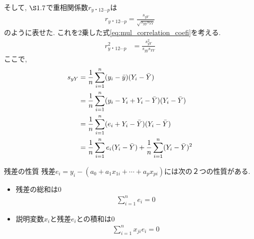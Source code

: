 そして, $\S1.7$で重相関係数$r_{y・12\cdots p}$は
\begin{align*}
  r_{y・12\cdots p} = \frac{s_{yY}}{\sqrt{s_{yy}s_{YY}}}
\end{align*}
のように表せた. これを2乗した式\eqref{eq:mul_correlation_coefi}を考える. 
\begin{align}
  \label{eq:mul_correlation_coefi}
  r_{y・12\cdots p}^2 
  &= \frac{s_{yY}^2}{s_{yy}s_{YY}} 
\end{align}
ここで, 
\begin{align}
  \notag
  s_{yY} &= \frac{1}{n}\sum_{i=1}^n(y_i-\bar{y})(Y_i-\bar{Y}) \\
  \notag
  &= \frac{1}{n}\sum_{i=1}^n(y_i-Y_i+Y_i-\bar{Y})(Y_i-\bar{Y}) \\
  \notag
  &= \frac{1}{n}\sum_{i=1}^n(e_i+Y_i-\bar{Y})(Y_i-\bar{Y}) \\
  \label{eq:cov_yY}
  &= \frac{1}{n}\sum_{i=1}^ne_i(Y_i-\bar{Y})+\frac{1}{n}\sum_{i=1}^n(Y_i-\bar{Y})^2 
\end{align}

\begin{itembox}[l]{残差の性質}
  残差$e_i = y_i - (a_0 + a_1x_{1i} + \cdots + a_px_{pi})$には次の２つの性質がある. 
  \begin{itemize}
    \item 残差の総和は0
    \begin{align}
      \label{eq:sum_ei}
      \sum_{i=1}^ne_i = 0
    \end{align}
    \item 説明変数$x_i$と残差$e_i$との積和は0
    \begin{align}
      \label{eq:sum_eixi}
      \sum_{i=1}^nx_{ji}e_i = 0
    \end{align}
  \end{itemize}
\end{itembox}


